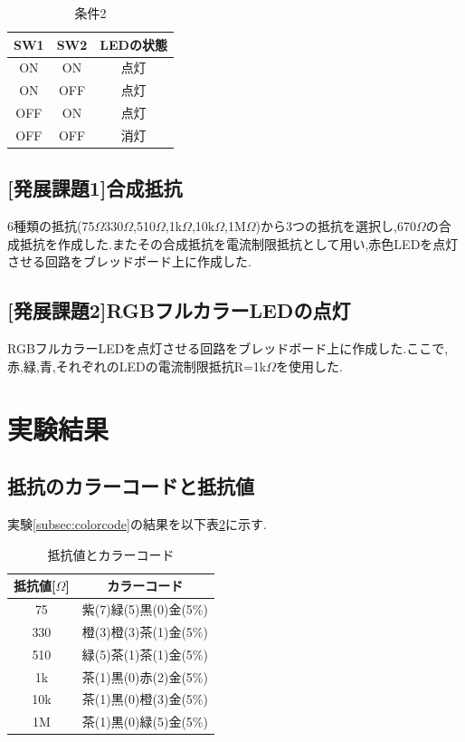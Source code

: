 \documentclass{jarticle}
\begin{document}
\begin{table}[H]
\centering
\caption{条件2}
\label{table:or}
\begin{center}
\begin{tabular}{c|c|c}
\hline \hline
SW1 & SW2 & LEDの状態\\ \hline
ON & ON &点灯 \\
ON& OFF & 点灯 \\
OFF& ON& 点灯\\
OFF& OFF & 消灯\\ \hline
\end{tabular}
\end{center}
\end{table}

\subsection{[発展課題1]合成抵抗}
\label{subsec:hatten1}
6種類の抵抗(75$\Omega$330$\Omega$,510$\Omega$,1k$\Omega$,10k$\Omega$,1M$\Omega$)から3つの抵抗を選択し,670$\Omega$の合成抵抗を作成した.またその合成抵抗を電流制限抵抗として用い,赤色LEDを点灯させる回路をブレッドボード上に作成した.

\subsection{[発展課題2]RGBフルカラーLEDの点灯}
\label{subsec:hatten2}
RGBフルカラーLEDを点灯させる回路をブレッドボード上に作成した.ここで,赤,緑,青,それぞれのLEDの電流制限抵抗R=1k$\Omega$を使用した.


\section{実験結果}
\subsection{抵抗のカラーコードと抵抗値}
実験\ref{subsec:colorcode}の結果を以下表\ref{table:colorcode}に示す.

\begin{table}[H]
\centering
\caption{抵抗値とカラーコード}
\label{table:colorcode}
\begin{center}
\begin{tabular}{c|c}
\hline \hline
抵抗値[$\Omega$] & カラーコード \\ \hline
75 &紫(7)緑(5)黒(0)金(5\%)\\ 
330 &橙(3)橙(3)茶(1)金(5\%)  \\ 
510 &緑(5)茶(1)茶(1)金(5\%) \\ 
1k & 茶(1)黒(0)赤(2)金(5\%) \\ 
10k &茶(1)黒(0)橙(3)金(5\%)  \\ 
1M & 茶(1)黒(0)緑(5)金(5\%) \\ \hline
\end{tabular}
\end{center}
\end{table}
\end{document}
